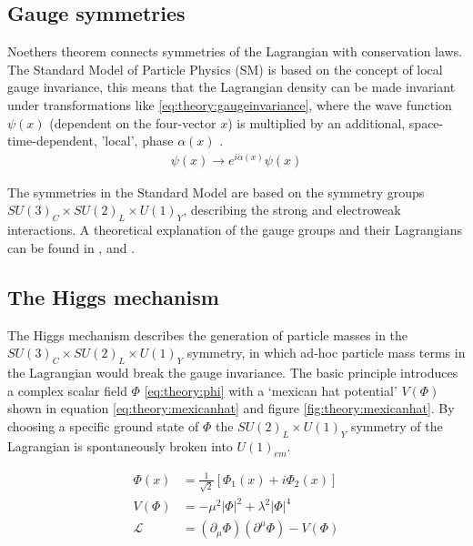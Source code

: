 \subsection{Gauge symmetries}
Noethers theorem connects symmetries of the Lagrangian with conservation laws. The Standard Model of Particle Physics (SM) is based on the concept of local gauge invariance, this means that the Lagrangian density can be made invariant under transformations like \eqref{eq:theory:gaugeinvariance}, where the wave function $\psi(x)$ (dependent on the four-vector $x$) is multiplied by an additional, space-time-dependent, 'local', phase  $\alpha(x)$ \cite{Peskin}.
\begin{align}
\psi(x) \rightarrow e^{i\alpha(x)}\psi(x) \label{eq:theory:gaugeinvariance}
\end{align}

The symmetries in the Standard Model are based on the symmetry groups $SU(3)_C \times SU(2)_L \times U(1)_Y$, describing the strong and electroweak interactions. A theoretical explanation of the gauge groups and their Lagrangians can be found in \cite{Griffiths}, \cite{AitchisonOne} and \cite{AitchisonTwo}.


\subsection{The Higgs mechanism}
The Higgs mechanism describes the generation of particle masses in the $SU(3)_C \times SU(2)_L \times U(1)_Y$ symmetry, in which ad-hoc particle mass terms in the Lagrangian would break the gauge invariance. The basic principle introduces a complex scalar field $\Phi$ \eqref{eq:theory:phi} with a `mexican hat potential' $V(\Phi)$ shown in equation \ref{eq:theory:mexicanhat} \cite{EM2} and figure \ref{fig:theory:mexicanhat}. By choosing a specific ground state of $\Phi$ the $SU(2)_L \times U(1)_Y$ symmetry of the Lagrangian is spontaneously broken into $U(1)_{em}$\cite{Peskin}. 
%

\begin{align}
\Phi(x) &= \frac{1}{\sqrt{2}}\left[\Phi_1(x) + i\Phi_2(x)\right] \label{eq:theory:phi}\\ 
V(\Phi) &= -\mu^2 |\Phi|^2 + \lambda^2 |\Phi|^4 \label{eq:theory:mexicanhat}\\ 
\mathcal{L} &= (\partial_\mu \Phi)(\partial^\mu \Phi) - V(\Phi) 
\end{align}

